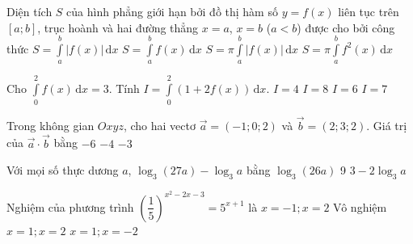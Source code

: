 \begin{ex}%
	Diện tích $S$ của hình phẳng giới hạn bởi đồ thị hàm số $y=f(x)$ liên tục trên $[a;b]$, trục hoành và hai đường thẳng $x=a$, $x=b$ ($a<b$) được cho bởi công thức
	\choice
	{\True $S=\displaystyle\int\limits_{a}^{b}|f(x)|\mathrm{\,d}x$}
	{$S=\displaystyle\int\limits_{a}^{b}f(x)\mathrm{\,d}x$}
	{$S=\pi\displaystyle\int\limits_{a}^{b}|f(x)|\mathrm{\,d}x$}
	{$S=\pi\displaystyle\int\limits_{a}^{b}f^2(x)\mathrm{\,d}x$}
\end{ex}

\begin{ex}%
	Cho $\displaystyle\int\limits_{0}^{2}f(x)\mathrm{\,d}x=3$. Tính $I=\displaystyle\int\limits_{0}^{2}(1+2f(x))\mathrm{\,d}x$.
	\choice
	{$I=4$}
	{\True $I=8$}
	{$I=6$}
	{$I=7$}
\end{ex}

\begin{ex}%
	Trong không gian $Oxyz$, cho hai vectơ $\vec{a}=(-1;0;2)$ và $\vec{b}=(2;3;2)$. Giá trị của $\vec{a} \cdot \vec{b}$ bằng
	\choice
	{}
	{$-6$}
	{$-4$}
	{$-3$}
\end{ex}

\begin{ex}%
	Với mọi số thực dương $a$, $\log_3(27a)-\log_3 a$ bằng
	\choice
	{$\log_3(26a)$}
	{9}
	{}
	{$3-2\log_3 a$}
\end{ex}

\begin{ex}%
	Nghiệm của phương trình $\left(\dfrac{1}{5}\right)^{x^2-2x-3}=5^{x+1}$ là
	\choice
	{\True $x=-1; x=2$}
	{Vô nghiệm}
	{$x=1; x=2$}
	{$x=1; x=-2$}
\end{ex}

